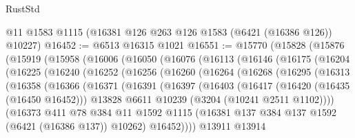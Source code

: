 \begin{lexlean}{RustStd}
\begin{coremodule}
    @11
    @1583
    @1115
    (@16381 @126 @263 @126 @1583 (@6421 (@16386 @126)) @10227)
@16452 := @6513 @16315 @1021
@16551 := @15770
    (@15828
      (@15876
        (@15919
          (@15958
            (@16006
              (@16050
                (@16076
                  (@16113
                    (@16146
                      (@16175
                        (@16204
                          (@16225
                            (@16240
                              (@16252
                                (@16256
                                  (@16260
                                    (@16264
                                      (@16268
                                        (@16295
                                          (@16313
                                            (@16358
                                              (@16366
                                                (@16371
                                                  (@16391
                                                    (@16397
                                                      (@16403
                                                        (@16417
                                                          (@16420 (@16435 (@16450 @16452)))
                                                          @13828
                                                          @6611
                                                          @10239
                                                          (@3204 (@10241 @2511 @1102))))
                                                      (@16373
                                                        @411
                                                        @78
                                                        @384
                                                        @11
                                                        @1592
                                                        @1115
                                                        (@16381
                                                          @137
                                                          @384
                                                          @137
                                                          @1592
                                                          (@6421 (@16386 @137))
                                                          @10262)
                                                        @16452))))
                                                @13911
                                                @13914

\end{coremodule}
\end{lexlean}
